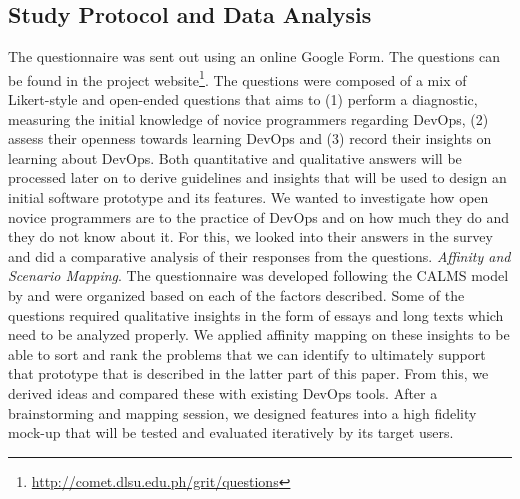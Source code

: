 \documentclass{sigchi}
\begin{document}
\subsection{Study Protocol and Data Analysis}
The questionnaire was sent out using an online Google Form. The questions can be found in the project website\footnote{\url{http://comet.dlsu.edu.ph/grit/questions}}. The questions were composed of a mix of Likert-style and open-ended questions that aims to (1) perform a diagnostic, measuring the initial knowledge of novice programmers regarding DevOps, (2) assess their openness towards learning DevOps and (3) record their insights on learning about DevOps. Both quantitative and qualitative answers will be processed later on to derive guidelines and insights that will be used to design an initial software prototype and its features. We wanted to investigate how open novice programmers are to the practice of DevOps and on how much they do and they do not know about it. For this, we looked into their answers in the survey and did a comparative analysis of their responses from the questions. \textit{Affinity and Scenario Mapping}. The questionnaire was developed following the CALMS model by \cite{riley2014keep} and were organized based on each of the factors described. Some of the questions required qualitative insights in the form of essays and long texts which need to be analyzed properly. We applied affinity mapping\cite{lucero2015using} on these insights to be able to sort and rank the problems that we can identify to ultimately support that prototype that is described in the latter part of this paper. From this, we derived ideas and compared these with existing DevOps tools. After a brainstorming and mapping session, we designed features into a high fidelity mock-up that will be tested and evaluated iteratively by its target users. 

\end{document}
